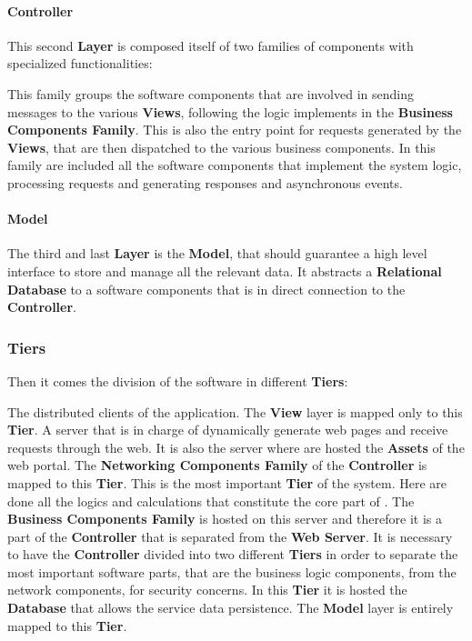 \paragraph{Controller}
This second \textbf{Layer} is composed itself of two families of components with specialized functionalities:
\begin{itemize}
	 This family groups the software components that are involved in sending messages to the various \textbf{Views}, following the logic implements in the \textbf{Business Components Family}.
	This is also the entry point for requests generated by the \textbf{Views}, that are then dispatched to the various business components.
	 In this family are included all the software components that implement the system logic, processing requests and generating responses and asynchronous events.
\end{itemize}

\paragraph{Model}
The third and last \textbf{Layer} is the \textbf{Model}, that should guarantee a high level interface to store and manage all the \myTaxiService{} relevant data.
It abstracts a \textbf{Relational Database} to a software components that is in direct connection to the \textbf{Controller}.

\subsubsection{Tiers}
Then it comes the division of the software in different \textbf{Tiers}:
\begin{itemize}
	 The distributed clients of the application. The \textbf{View} layer is mapped only to this \textbf{Tier}.
	 A server that is in charge of dynamically generate web pages and receive requests through the web. It is also the server where are hosted the \textbf{Assets} of the web portal. The \textbf{Networking Components Family} of the \textbf{Controller} is mapped to this \textbf{Tier}.
	 This is the most important \textbf{Tier} of the system. Here are done all the logics and calculations that constitute the core part of \myTaxiService{}. The \textbf{Business Components Family} is hosted on this server and therefore it is a part of the \textbf{Controller} that is separated from the \textbf{Web Server}. It is necessary to have the \textbf{Controller} divided into two different \textbf{Tiers} in order to separate the most important software parts, that are the business logic components, from the network components, for security concerns.
	In this \textbf{Tier} it is hosted the \textbf{Database} that allows the service data persistence. The \textbf{Model} layer is entirely mapped to this \textbf{Tier}.
\end{itemize}

